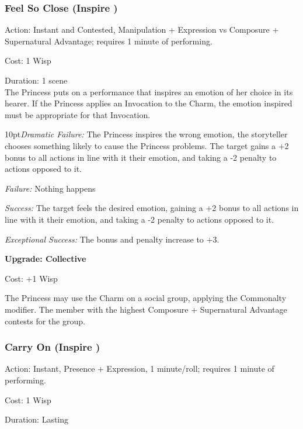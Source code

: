 \subsubsection*{Feel So Close (Inspire \textbullet\textbullet)}

\noindent Action: Instant and Contested, Manipulation + Expression vs Composure + Supernatural Advantage; requires 1 minute of performing. 

\noindent Cost: 1 Wisp

\noindent Duration: 1 scene \\

\noindent The Princess puts on a performance that inspires an emotion of her choice in its hearer. If the Princess applies an Invocation to the Charm, the emotion inspired must be appropriate for that Invocation.

\begin{myindentpar}{10pt}\emph{Dramatic Failure:} The Princess inspires the wrong emotion, the storyteller chooses something likely to cause the Princess problems. The target gains a +2 bonus to all actions in line with it their emotion, and taking a -2 penalty to actions opposed to it.
 
 \emph{Failure:} Nothing happens
 
 \emph{Success:} The target feels the desired emotion, gaining a +2 bonus to all actions in line with it their emotion, and taking a -2 penalty to actions opposed to it.
 
 \emph{Exceptional Success:} The bonus and penalty increase to +3. 
 
 \textbf{Upgrade: Collective}

\noindent Cost: +1 Wisp

The Princess may use the Charm on a social group, applying the Commonalty modifier. The member with the highest Composure + Supernatural Advantage contests for the group.\end{myindentpar}

\subsubsection*{Carry On (Inspire \textbullet\textbullet)}

\noindent Action: Instant, Presence + Expression, 1 minute/roll; requires 1 minute of performing. 

\noindent Cost: 1 Wisp

\noindent Duration: Lasting \\

